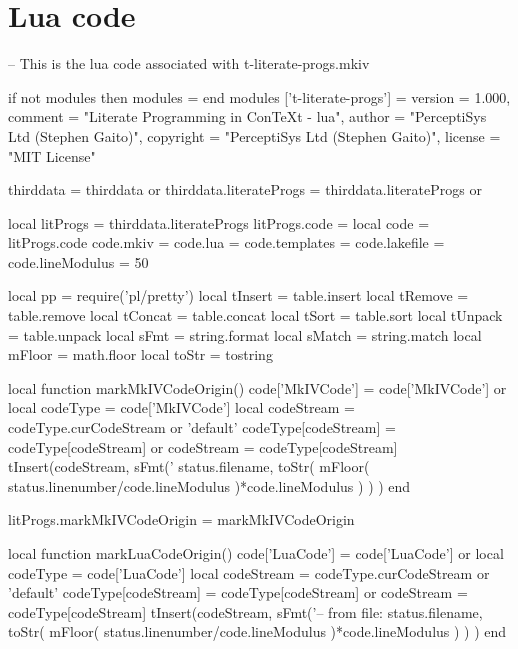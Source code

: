 \unprotect

\stopMkIVCode

\section{Lua code}

\startLuaCode
-- This is the lua code associated with t-literate-progs.mkiv

if not modules then modules = { } end
modules ['t-literate-progs'] = {
    version   = 1.000,
    comment   = "Literate Programming in ConTeXt - lua",
    author    = "PerceptiSys Ltd (Stephen Gaito)",
    copyright = "PerceptiSys Ltd (Stephen Gaito)",
    license   = "MIT License"
}

thirddata               = thirddata               or {}
thirddata.literateProgs = thirddata.literateProgs or {}

local litProgs   = thirddata.literateProgs
litProgs.code    = {}
local code       = litProgs.code
code.mkiv        = {}
code.lua         = {}
code.templates   = {}
code.lakefile    = {}
code.lineModulus = 50

local pp = require('pl/pretty')
local tInsert = table.insert
local tRemove = table.remove
local tConcat = table.concat
local tSort   = table.sort
local tUnpack = table.unpack
local sFmt    = string.format
local sMatch  = string.match
local mFloor  = math.floor
local toStr   = tostring
\stopLuaCode

\startLuaCode
local function markMkIVCodeOrigin()
  code['MkIVCode']     = code['MkIVCode'] or { }
  local codeType       = code['MkIVCode']
  local codeStream     = codeType.curCodeStream or 'default'
  codeType[codeStream] = codeType[codeStream] or { }
  codeStream           = codeType[codeStream]
  tInsert(codeStream,
    sFmt('%
      status.filename,
      toStr(
        mFloor(
          status.linenumber/code.lineModulus
        )*code.lineModulus
      )
    )
  )
end

litProgs.markMkIVCodeOrigin = markMkIVCodeOrigin

local function markLuaCodeOrigin()
  code['LuaCode']      = code['LuaCode'] or { }
  local codeType       = code['LuaCode']
  local codeStream     = codeType.curCodeStream or 'default'
  codeType[codeStream] = codeType[codeStream] or { }
  codeStream           = codeType[codeStream]
  tInsert(codeStream,
    sFmt('-- from file: %
      status.filename,
      toStr(
        mFloor(
          status.linenumber/code.lineModulus
        )*code.lineModulus
      )
    )
  )
end


